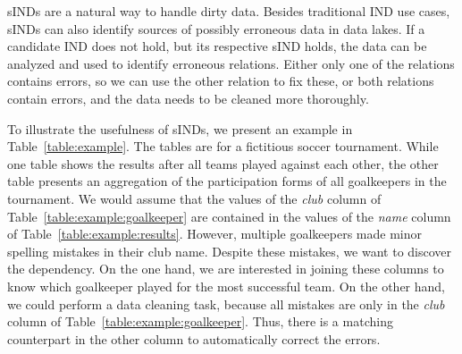 sINDs are a natural way to handle dirty data.
Besides traditional IND use cases, sINDs can also identify sources of possibly erroneous data in data lakes.
If a candidate IND does not hold, but its respective sIND holds, the data can be analyzed and used to identify erroneous relations.
Either only one of the relations contains errors, so we can use the other relation to fix these, or both relations contain errors, and the data needs to be cleaned more thoroughly.

To illustrate the usefulness of sINDs, we present an example in Table~\ref{table:example}.
The tables are for a fictitious soccer tournament.
While one table shows the results after all teams played against each other, the other table presents an aggregation of the participation forms of all goalkeepers in the tournament.
We would assume that the values of the \emph{club} column of Table~\ref{table:example:goalkeeper} are contained in the values of the \emph{name} column of Table~\ref{table:example:results}.
However, multiple goalkeepers made minor spelling mistakes in their club name.
Despite these mistakes, we want to discover the dependency.
On the one hand, we are interested in joining these columns to know which goalkeeper played for the most successful team.
On the other hand, we could perform a data cleaning task, because all mistakes are only in the \emph{club} column of Table~\ref{table:example:goalkeeper}.
Thus, there is a matching counterpart in the other column to automatically correct the errors.

